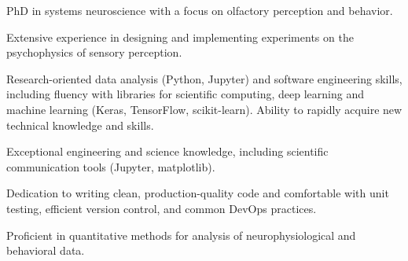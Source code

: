 

\begin{cventries}
    \vspace{2mm}
    \begin{cvparagraph}
        \begin{cvitems}
            \item{PhD in systems neuroscience with a focus on olfactory perception and behavior.}
            \item{Extensive experience in designing and implementing experiments on the psychophysics of sensory perception.}
            \item{Research-oriented data analysis (Python, Jupyter) and software engineering skills, including fluency with libraries for scientific computing, deep learning and machine learning (Keras, TensorFlow, scikit-learn). Ability to rapidly acquire new technical knowledge and skills.}
            \item{Exceptional engineering and science knowledge, including scientific communication tools (Jupyter, matplotlib).}
            \item{Dedication to writing clean, production-quality code and comfortable with unit testing, efficient version control, and common DevOps practices.}
            \item{Proficient in quantitative methods for analysis of neurophysiological and behavioral data.}

        \end{cvitems}
    \end{cvparagraph}

\end{cventries}
